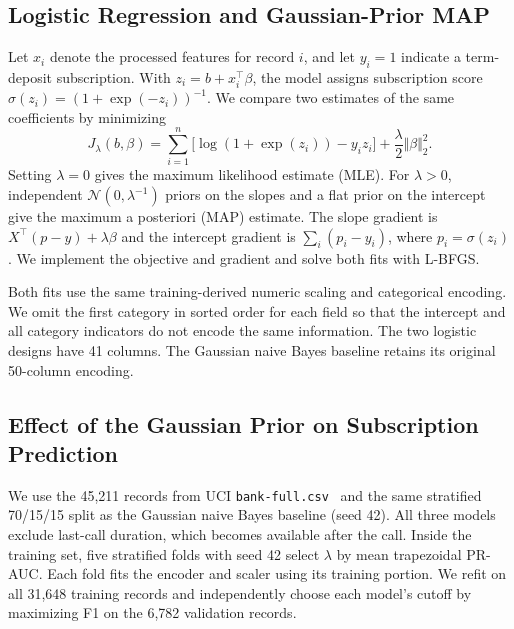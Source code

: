 
\subsection{Logistic Regression and Gaussian-Prior MAP}
Let $x_i$ denote the processed features for record $i$, and let $y_i=1$
indicate a term-deposit subscription. With $z_i=b+x_i^\top\beta$, the model
assigns subscription score $\sigma(z_i)=(1+\exp(-z_i))^{-1}$. We compare
two estimates of the same coefficients by minimizing
\begin{equation}
J_{\lambda}(b,\beta)=\sum_{i=1}^{n}
\bigl[\log(1+\exp(z_i))-y_i z_i\bigr]
+\frac{\lambda}{2}\Vert\beta\Vert_2^2.
\label{eq:b-penalized-nll}
\end{equation}
Setting $\lambda=0$ gives the maximum likelihood estimate (MLE).
For $\lambda>0$, independent $\mathcal{N}(0,\lambda^{-1})$ priors on the
slopes and a flat prior on the intercept give the maximum a posteriori
(MAP) estimate. The slope gradient is $X^\top(p-y)+\lambda\beta$ and the
intercept gradient is $\sum_i(p_i-y_i)$, where $p_i=\sigma(z_i)$. We
implement the objective and gradient and solve both fits with L-BFGS.

Both fits use the same training-derived numeric scaling and categorical
encoding. We omit the first category in sorted order for each field so
that the intercept and all category indicators do not encode the same
information. The two logistic designs have 41 columns. The Gaussian
naive Bayes baseline retains its original 50-column encoding.

\subsection{Effect of the Gaussian Prior on Subscription Prediction}
We use the 45,211 records from UCI \texttt{bank-full.csv}~\cite{moro2014bank}
and the same stratified 70/15/15 split as the Gaussian naive Bayes
baseline (seed 42). All three models exclude last-call duration, which
becomes available after the call. Inside the training set, five
stratified folds with seed 42 select $\lambda$ by mean trapezoidal PR-AUC.
Each fold fits the encoder and scaler using its training portion.
We refit on all 31,648 training records and independently choose each
model's cutoff by maximizing F1 on the 6,782 validation records.

